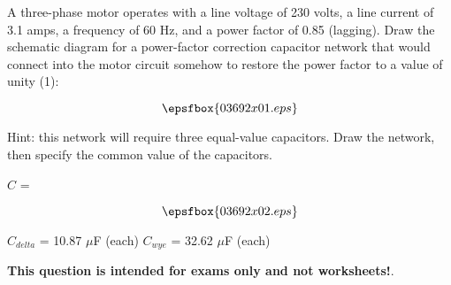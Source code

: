 

A three-phase motor operates with a line voltage of 230 volts, a line current of 3.1 amps, a frequency of 60 Hz, and a power factor of 0.85 (lagging).  Draw the schematic diagram for a power-factor correction capacitor network that would connect into the motor circuit somehow to restore the power factor to a value of unity (1):

$$\epsfbox{03692x01.eps}$$

Hint: this network will require three equal-value capacitors.  Draw the network, then specify the common value of the capacitors.  

\vskip 10pt

$C$ = 







$$\epsfbox{03692x02.eps}$$

\vskip 10pt

$C_{delta}$ = 10.87 $\mu$F (each) \hskip 150pt $C_{wye}$ = 32.62 $\mu$F (each)







{\bf This question is intended for exams only and not worksheets!}.



